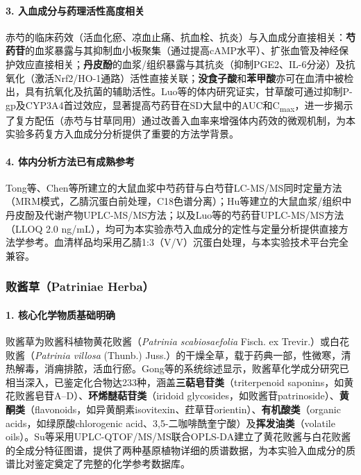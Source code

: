 \documentclass[12pt,a4paper,UTF8,scheme=chinese]{ctexart}
\newcommand{\compoundname}[1]{\textbf{#1}}
\newcommand{\herbname}[1]{\textit{#1}}
\begin{document}
\paragraph{3. 入血成分与药理活性高度相关}

赤芍的临床药效（活血化瘀、凉血止痛、抗血栓、抗炎）与入血成分直接相关：\compoundname{芍药苷}的血浆暴露与其抑制血小板聚集（通过提高cAMP水平）、扩张血管及神经保护效应直接相关；\compoundname{丹皮酚}的血浆/组织暴露与其抗炎（抑制PGE2、IL-6分泌）及抗氧化（激活Nrf2/HO-1通路）活性直接关联；\compoundname{没食子酸}和\compoundname{苯甲酸}亦可在血清中被检出，具有抗氧化及抗菌的辅助活性。Luo等\cite{QiuLab2019}的体内研究证实，甘草酸可通过抑制P-gp及CYP3A4首过效应，显著提高芍药苷在SD大鼠中的AUC和C\textsubscript{max}，进一步揭示了复方配伍（赤芍与甘草同用）通过改善入血率来增强体内药效的微观机制，为本实验多药复方入血成分分析提供了重要的方法学背景。

\paragraph{4. 体内分析方法已有成熟参考}

Tong等\cite{Tong2010}、Chen等\cite{Chen2016P}所建立的大鼠血浆中芍药苷与白芍苷LC-MS/MS同时定量方法（MRM模式，乙腈沉蛋白前处理，C18色谱分离）；Hu等\cite{Hu2020}建立的大鼠血浆/组织中丹皮酚及代谢产物UPLC-MS/MS方法；以及Luo等\cite{QiuLab2019}的芍药苷UPLC-MS/MS方法（LLOQ 2.0 ng/mL），均可为本实验赤芍入血成分的定性与定量分析提供直接方法学参考。血清样品均采用乙腈1:3（V/V）沉蛋白处理，与本实验技术平台完全兼容。

\subsubsection{败酱草（Patriniae Herba）}

\paragraph{1. 核心化学物质基础明确}

败酱草为败酱科植物黄花败酱（\herbname{Patrinia scabiosaefolia} Fisch. ex Trevir.）或白花败酱（\herbname{Patrinia villosa} (Thunb.) Juss.）的干燥全草，载于药典一部，性微寒，清热解毒，消痈排脓，活血行瘀。Gong等\cite{Gong2021}的系统综述显示，败酱草化学成分研究已相当深入，已鉴定化合物达233种，涵盖\textbf{三萜皂苷类}（triterpenoid saponins，如黄花败酱皂苷A--D）、\textbf{环烯醚萜苷类}（iridoid glycosides，如败酱苷patrinoside）、\textbf{黄酮类}（flavonoids，如异黄酮素isovitexin、荭草苷orientin）、\textbf{有机酸类}（organic acids，如绿原酸chlorogenic acid、3,5-二咖啡酰奎宁酸）及\textbf{挥发油类}（volatile oils）。Su等\cite{Su2022}采用UPLC-QTOF/MS/MS联合OPLS-DA建立了黄花败酱与白花败酱的全成分特征图谱，提供了两种基原植物详细的质谱数据，为本实验入血成分的质谱比对鉴定奠定了完整的化学参考数据库。
\end{document}
